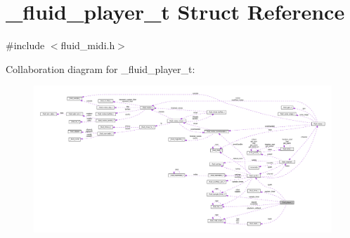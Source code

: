 \hypertarget{struct__fluid__player__t}{}\section{\+\_\+fluid\+\_\+player\+\_\+t Struct Reference}
\label{struct__fluid__player__t}


{\ttfamily \#include $<$fluid\+\_\+midi.\+h$>$}



Collaboration diagram for \+\_\+fluid\+\_\+player\+\_\+t\+:
\nopagebreak
\begin{figure}[H]
\begin{center}
\leavevmode
\includegraphics[width=350pt]{struct__fluid__player__t__coll__graph}
\end{center}
\end{figure}
